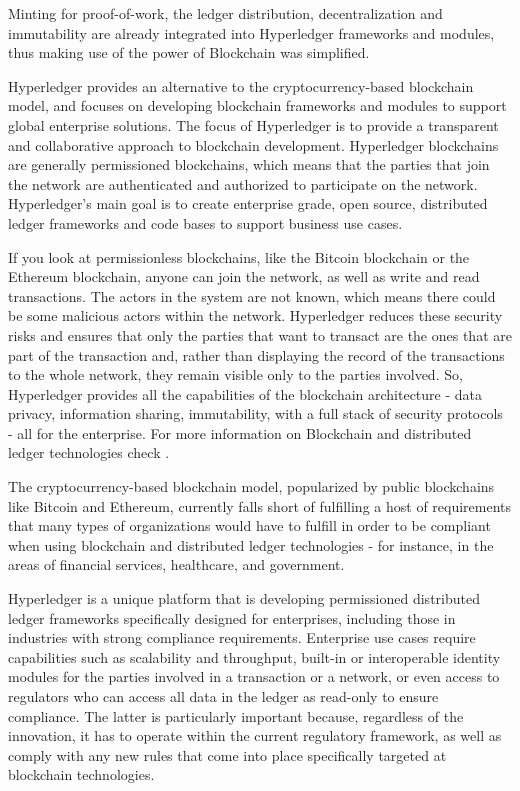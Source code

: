 Minting for proof-of-work, the ledger distribution, decentralization and immutability are already integrated into Hyperledger frameworks and modules, thus making use of the power of Blockchain was simplified. 

Hyperledger provides an alternative to the cryptocurrency-based blockchain model, and focuses on developing blockchain frameworks and modules to support global enterprise solutions. The focus of Hyperledger is to provide a transparent and collaborative approach to blockchain development.
Hyperledger blockchains are generally permissioned blockchains, which means that the parties that join the network are authenticated and authorized to participate on the network. Hyperledger’s main goal is to create enterprise grade, open source, distributed ledger frameworks and code bases to support business use cases.

If you look at permissionless blockchains, like the Bitcoin blockchain or the Ethereum blockchain, anyone can join the network, as well as write and read transactions. The actors in the system are not known, which means there could be some malicious actors within the network.
Hyperledger reduces these security risks and ensures that only the parties that want to transact are the ones that are part of the transaction and, rather than displaying the record of the transactions to the whole network, they remain visible only to the parties involved. So, Hyperledger provides all the capabilities of the blockchain architecture - data privacy, information sharing, immutability, with a full stack of security protocols - all for the enterprise. For more information on Blockchain and distributed ledger technologies check \cite{isotc307blockch}.

The cryptocurrency-based blockchain model, popularized by public blockchains like Bitcoin and Ethereum, currently falls short of fulfilling a host of requirements that many types of organizations would have to fulfill in order to be compliant when using blockchain and distributed ledger technologies - for instance, in the areas of financial services, healthcare, and government.

Hyperledger is a unique platform that is developing permissioned distributed ledger frameworks specifically designed for enterprises, including those in industries with strong compliance requirements. Enterprise use cases require capabilities such as scalability and throughput, built-in or interoperable identity modules for the parties involved in a transaction or a network, or even access to regulators who can access all data in the ledger as read-only to ensure compliance. The latter is particularly important because, regardless of the innovation, it has to operate within the current regulatory framework, as well as comply with any new rules that come into place specifically targeted at blockchain technologies.

